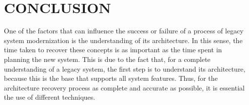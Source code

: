 \documentclass{sig-alternate-05-2015}
\begin{document}





\section{CONCLUSION}\label{sec:conclusion}
One of the factors that can influence the success or failure of a process of legacy system modernization is the understanding of its architecture. In this sense, the time taken to recover these concepts is as important as the time spent in planning the new system. This is due to the fact that, for a complete understanding of a legacy system, the first step is to understand its architecture, because this is the base that supports all system features. Thus, for the architecture recovery process as complete and accurate as possible, it is essential the use of different techniques.
\end{document}
